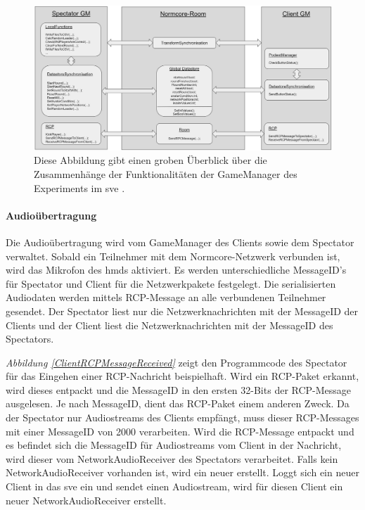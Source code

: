 \documentclass[a4paper,11pt]{article}%
\renewcommand{\\}{\vspace*{0.5\baselineskip} \newline}
\begin{document}
\begin{figure}[H]
		\begin{footnotesize}
		\centering
			\includegraphics[width=\textwidth]{Abbildungen/GameManagerClientSpectator.jpg}
			\caption[Funktionalitäten des GameManagers]{Diese Abbildung gibt einen groben Überblick über die Zusammenhänge der Funktionalitäten der GameManager des Experiments im \ac{sve} .}
			\label{GameManagerClientSpectator}
		\end{footnotesize}
	\end{figure}

\paragraph{Audioübertragung}
Die Audioübertragung wird vom GameManager des Clients sowie dem Spectator verwaltet. Sobald ein Teilnehmer mit dem Normcore-Netzwerk verbunden ist, wird das Mikrofon des \ac{hmd}s aktiviert. Es werden unterschiedliche MessageID’s für Spectator und Client für die Netzwerkpakete festgelegt. Die serialisierten Audiodaten werden mittels RCP-Message an alle verbundenen Teilnehmer gesendet. Der Spectator liest nur die Netzwerknachrichten mit der MessageID der Clients und der Client liest die Netzwerknachrichten mit der MessageID des Spectators.

\textit{Abbildung \ref{ClientRCPMessageReceived}} zeigt den Programmcode des Spectator für das Eingehen einer RCP-Nachricht beispielhaft. Wird ein RCP-Paket erkannt, wird dieses entpackt und die MessageID in den ersten 32-Bits der RCP-Message ausgelesen. Je nach MessageID, dient das RCP-Paket einem anderen Zweck. Da der Spectator nur Audiostreams des Clients empfängt, muss dieser RCP-Messages mit einer MessageID von \glqq{}2000\dq{} verarbeiten. 
Wird die RCP-Message entpackt und es befindet sich die MessageID für Audiostreams vom Client in der Nachricht, wird dieser vom \glqq{}NetworkAudioReceiver\dq{} des Spectators verarbeitet. Falls kein \glqq{}NetworkAudioReceiver\dq{} vorhanden ist, wird ein neuer erstellt. Loggt sich ein neuer Client in das \ac{sve} ein und sendet einen Audiostream, wird für diesen Client ein neuer \glqq{}NetworkAudioReceiver\dq{} erstellt.
\end{document}

